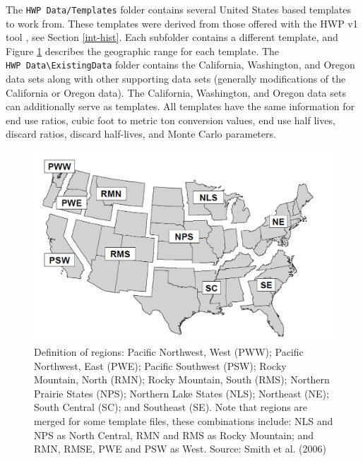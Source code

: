 \documentclass[
  openany]{book}
\begin{document}
The \texttt{HWP\ Data/Templates} folder contains several United States based templates to work from. These templates were derived from those offered with the HWP v1 tool \autocite{stockmann2014}, see Section \ref{int-hist}. Each subfolder contains a different template, and Figure \ref{fig:template-map-fig} describes the geographic range for each template. The \texttt{HWP\ Data\textbackslash{}ExistingData} folder contains the California, Washington, and Oregon data sets along with other supporting data sets (generally modifications of the California or Oregon data). The California, Washington, and Oregon data sets can additionally serve as templates. All templates have the same information for end use ratios, cubic foot to metric ton conversion values, end use half lives, discard ratios, discard half-lives, and Monte Carlo parameters.

\begin{figure}
\includegraphics[width=1\linewidth]{images/regions_map} \caption{Definition of regions: Pacific Northwest, West (PWW); Pacific Northwest, East (PWE); Pacific Southwest (PSW); Rocky Mountain, North (RMN); Rocky Mountain, South (RMS); Northern Prairie States (NPS); Northern Lake States (NLS); Northeast (NE); South Central (SC); and Southeast (SE).  Note that regions are merged for some template files, these combinations include: NLS and NPS as North Central, RMN and RMS as Rocky Mountain; and RMN, RMSE, PWE and PSW as West. Source: Smith et al. (2006)}\label{fig:template-map-fig}
\end{figure}
\end{document}
